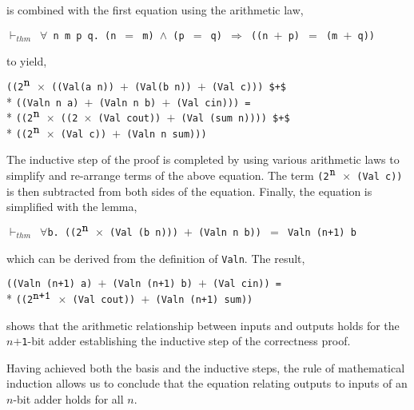 \begin{normalsize}
is combined with the first equation using the arithmetic law,

$\vdash_{thm}$\verb" "$\forall$\verb" n m p q. (n "$=$\verb" m) "$\wedge$\verb" (p "$=$\verb" q) "$\Longrightarrow$\verb" ((n "$+$\verb" p) "$=$\verb" (m "$+$\verb" q))"

to yield,

\hspace*{\fill}
\begin{minipage}{10.5cm}
\verb"((2"$^{\verb"n"}$\verb" "$\times$\verb" ((Val(a n)) "$+$\verb" (Val(b n)) "$+$\verb" (Val c))) $+$"\\*
\phantom{\verb"("}\verb"((Valn n a) "$+$\verb" (Valn n b) "$+$\verb" (Val cin))) ="\\*
\verb"((2"$^{\verb"n"}$\verb" "$\times$\verb" ((2 "$\times$\verb" (Val cout)) "$+$\verb" (Val (sum n)))) $+$"\\*
\phantom{\verb"("}\verb"((2"$^{\verb"n"}$\verb" "$\times$\verb" (Val c)) "$+$\verb" (Valn n sum)))"
\end{minipage}
\hspace*{\fill}

The inductive step of the proof is completed by
using various arithmetic laws
to simplify and re-arrange terms of the above equation.
The term \mbox{\verb"(2"$^{\verb"n"}$\verb" "$\times$\verb" (Val c))"}
is then subtracted from both sides of the equation.
Finally, the equation is simplified with the lemma,

$\vdash_{thm}$\verb" "$\forall$\verb"b. ((2"$^{\verb"n"}$\verb" "$\times$\verb" (Val (b n))) "$+$\verb" (Valn n b)) "$=$\verb" Valn (n+1) b"

which can be derived from the definition of \verb"Valn".
The result,

\hspace*{\fill}
\begin{minipage}{11cm}
\verb"((Valn (n+1) a) "$+$\verb" (Valn (n+1) b) "$+$\verb" (Val cin)) ="\\*
\verb"((2"$^{\verb"n+1"}$\verb" "$\times$\verb" (Val cout)) "$+$\verb" (Valn (n+1) sum))"
\end{minipage}
\hspace*{\fill}

shows that the arithmetic relationship between
inputs and outputs holds for the
$n$$+$\verb"1"-bit adder establishing the inductive step
of the correctness proof.

Having achieved both the basis and the inductive steps,
the rule of mathematical induction allows us to conclude that the
equation relating outputs to inputs of an \mbox{$n$-bit} adder holds
for all $n$.


\end{normalsize}
